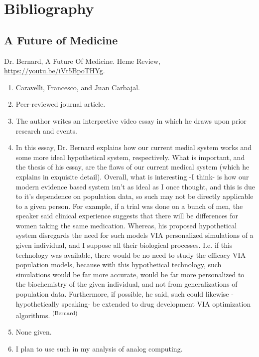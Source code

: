 \section*{Bibliography}

\subsection*{A Future of Medicine}
Dr. Bernard, A Future Of Medicine. Heme Review, \url{https://youtu.be/iVt5BpoTHYg}.
\begin{enumerate}
    \item Caravelli, Francesco, and Juan Carbajal.
    \item Peer-reviewed journal article.
    \item The author writes an interpretive video essay in which he draws upon prior research and events.
    \item In this essay, Dr. Bernard explains how our current medial system works and some more ideal hypothetical system, respectively. What is important, and the thesis of his essay, are the flaws of our current medical system (which he explains in exquisite detail). Overall, what is interesting -I think- is how our modern evidence based system isn’t as ideal as I once thought, and this is due to it’s dependence on population data, so such may not be directly applicable to a given person. For example, if a trial was done on a bunch of men, the speaker said clinical experience suggests that there will be differences for women taking the same medication. Whereas, his proposed hypothetical system disregards the need for such models VIA personalized simulations of a given individual, and I suppose all their biological processes. I.e. if this technology was available, there would be no need to study the efficacy VIA population models, because with this hypothetical technology, such simulations would be far more accurate, would be far more personalized to the biochemistry of the given individual, and not from generalizations of population data. Furthermore, if possible, he said, such could likewise -hypothetically speaking- be extended to drug development VIA optimization algorithms. \textsuperscript{(Bernard)}
    \item None given. 
    \item I plan to use such in my analysis of analog computing. 
\end{enumerate}



